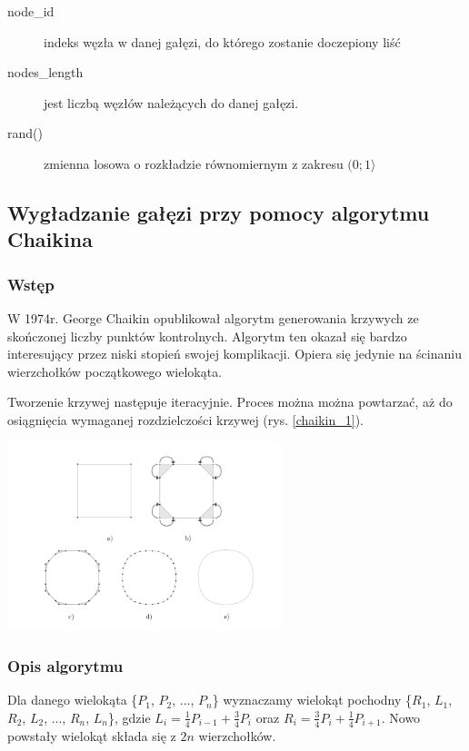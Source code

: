 \begin{description}
	\item[node\_id] indeks węzła w danej gałęzi, do którego zostanie doczepiony liść
	\item[nodes\_length] jest liczbą węzłów należących do danej gałęzi.
	\item[rand()] zmienna losowa o rozkładzie równomiernym z zakresu $(0;1\rangle$
\end{description}

\subsection{Wygładzanie gałęzi przy pomocy algorytmu Chaikina \cite{smoothing}}
\subsubsection{Wstęp}
W 1974r. George Chaikin opublikował algorytm generowania krzywych ze skończonej liczby punktów kontrolnych. Algorytm ten okazał się bardzo interesujący przez niski stopień swojej komplikacji. Opiera się jedynie na ścinaniu wierzchołków początkowego wielokąta.

Tworzenie krzywej następuje iteracyjnie. Proces można można powtarzać, aż do osiągnięcia wymaganej rozdzielczości krzywej (rys. \ref{chaikin_1}).

\begin{center}
	\includegraphics[width=80mm]{images/model/chaikin_1.png}
	\label{chaikin_1}
\end{center}

\subsubsection{Opis algorytmu}

Dla danego wielokąta \{$P_1$, $P_2$, ..., $P_n$\} wyznaczamy wielokąt pochodny \{$R_1$, $L_1$, $R_2$, $L_2$, ..., $R_n$, $L_n$\}, gdzie
$L_i = \frac{1}{4}P_{i-1} + \frac{3}{4}P_i$ oraz $R_i = \frac{3}{4}P_i + \frac{1}{4}P_{i+1}$.
Nowo powstały wielokąt składa się z $2n$ wierzchołków.

